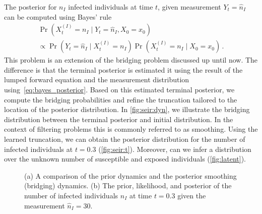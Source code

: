 The posterior for $n_I$ infected individuals at time $t$, given measurement $Y_t=\hat{n}_I$ can be computed using  Bayes' rule
\begin{multline}\label{eq:bayes_posterior}
	\Pr(X_t^{(I)}=n_I\mid Y_t=\hat{n}_I, X_0=x_0)\\ \propto \Pr(Y_t=\hat{n}_I\mid X_t^{(I)} = n_I)\Pr(X_t^{(I)}=n_I\mid X_0=x_0)\,.
\end{multline}
This problem is an extension of the bridging problem discussed up until now.
The difference is that the terminal posterior   is   estimated it using the result of the lumped forward equation and the measurement distribution using~\eqref{eq:bayes_posterior}.
Based on this estimated terminal posterior, we compute the bridging probabilities and refine the truncation tailored to the location of the posterior distribution.
In \autoref{fig:seir:dyn}, we illustrate the bridging distribution between the terminal posterior and initial distribution.
In the context of filtering problems this is commonly referred to as smoothing.
Using the learned truncation, we can obtain the posterior distribution for the number of infected individuals at $t=0.3$ (\autoref{fig:seir:t}).
Moreover, can we infer a distribution over the unknown number of susceptible and exposed individuals (\autoref{fig:latent}).
\begin{figure}[t]
    \myfloatalign
	\caption[Bayesian estimation on the \ac{SEIR} model]{
	    (a) A comparison of the prior dynamics and the posterior smoothing (bridging) dynamics.
	    (b) The prior, likelihood, and posterior of the number of infected individuals $n_I$ at time $t=0.3$ given the measurement $\hat{n}_I=30$.}
\end{figure}
